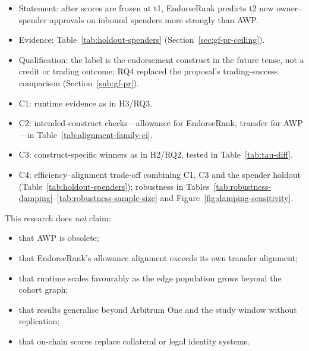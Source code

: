 
\begin{itemize}
\item Statement: after scores are frozen at t1, EndorseRank predicts t2 new owner--spender approvals on inbound spenders more strongly than AWP.
\item Evidence: Table~\ref{tab:holdout-spenders} (Section~\ref{sec:gf-pr-ceiling}).
\item Qualification: the label is the endorsement construct in the future tense, not a credit or trading outcome; RQ4 replaced the proposal's trading-success comparison (Section~\ref{sub:gf-pr}).
\end{itemize}


\begin{itemize}
\item C1: runtime evidence as in H3/RQ3.
\item C2: intended-construct checks---allowance for EndorseRank, transfer for AWP---in Table~\ref{tab:alignment-family-ci}.
\item C3: construct-specific winners as in H2/RQ2, tested in Table~\ref{tab:tau-diff}.
\item C4: efficiency--alignment trade-off combining C1, C3 and the spender holdout (Table~\ref{tab:holdout-spenders}); robustness in Tables~\ref{tab:robustness-damping}--\ref{tab:robustness-sample-size} and Figure~\ref{fig:damping-sensitivity}.
\end{itemize}


This research does \emph{not} claim:

\begin{itemize}
\item that AWP is obsolete;
\item that EndorseRank's allowance alignment exceeds its own transfer alignment;
\item that runtime scales favourably as the edge population grows beyond the cohort graph;
\item that results generalise beyond Arbitrum One and the study window without replication;
\item that on-chain scores replace collateral or legal identity systems.
\end{itemize}

